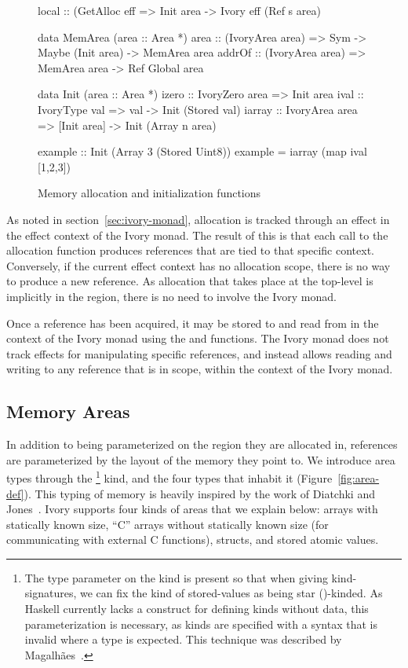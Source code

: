 \begin{figure}[ht]
\begin{code}
local  :: (GetAlloc eff %
       => Init area -> Ivory eff (Ref s area)

data MemArea (area :: Area *)
area   :: (IvoryArea area)
       => Sym -> Maybe (Init area) -> MemArea area
addrOf :: (IvoryArea area)
       => MemArea area -> Ref Global area

data Init (area :: Area *)
izero  :: IvoryZero area => Init area
ival   :: IvoryType val  => val -> Init (Stored val)
iarray :: IvoryArea area
       => [Init area] -> Init (Array n area)

example :: Init (Array 3 (Stored Uint8))
example  = iarray (map ival [1,2,3])
\end{code}
\caption{Memory allocation and initialization functions}
\label{fig:mem-alloc}
\end{figure}

As noted in section~\ref{sec:ivory-monad}, allocation is tracked through an
effect in the effect context of the Ivory monad.  The result of this is that
each call to the  allocation function produces references that are
tied to that specific context.  Conversely, if the current effect context has
no allocation scope, there is no way to produce a new reference.  As allocation
that takes place at the top-level is implicitly in the  region, there
is no need to involve the Ivory monad.

Once a reference has been acquired, it may be stored to and read from in the
context of the Ivory monad using the  and  functions.  The
Ivory monad does not track effects for manipulating specific references, and
instead allows reading and writing to any reference that is in scope, within the
context of the Ivory monad.

\subsection{Memory Areas}
\label{sec:area}

In addition to being parameterized on the region they are allocated in,
references are parameterized by the layout of the memory they point to.  We
introduce area types through the \footnote{The type parameter on the
 kind is present so that when giving kind-signatures, we can fix the
kind of stored-values as being star (\cd{*})-kinded.  As Haskell currently lacks
a construct for defining kinds without data, this parameterization is necessary,
as kinds are specified with a syntax that is invalid where a type is expected.
This technique was described by Magalh\~{a}es~\cite{jpm:trkgp:12}.} kind, and
the four types that inhabit it (Figure~\ref{fig:area-def}).  This typing of
memory is heavily inspired by the work of Diatchki and Jones~\cite{memareas}.
Ivory supports four kinds of areas that we explain below: arrays with statically
known size, ``C'' arrays without statically known size (for communicating with
external C functions), structs, and stored atomic values.

